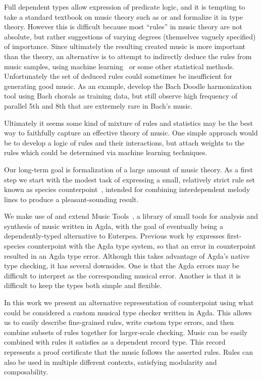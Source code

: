 Full dependent types allow expression of predicate logic, and it is
tempting to take a standard textbook on music theory such as
\citet{piston-harmony} or \citet{aldwell2018harmony} and 
formalize it in type theory. However this is difficult because most
``rules'' in music theory are not absolute, but rather suggestions of
varying degrees (themselves vaguely specified) of importance. Since
ultimately the resulting created music is more important than the
theory, an alternative is to attempt to indirectly deduce the rules
from music samples, using machine learning~\citep{huang-cp} or
some other statistical methods. Unfortunately the set of deduced
rules could sometimes be insufficient for generating good music.
As an example, \citet{roberts-cp} develop the Bach Doodle
harmonization tool using Bach chorals as training data, but still
observe high frequency of parallel 5th and 8th that are extremely
rare in Bach's music.

Ultimately it seems some kind of mixture of rules and statistics may
be the best way to faithfully capture an effective theory of
music. One simple approach would be to develop a logic of rules and
their interactions, but attach weights to the rules which could be
determined via machine learning techniques.

Our long-term goal is formalization of a large amount of music theory.
As a first step we start with the modest task of expressing a small,
relatively strict rule set known as species
counterpoint~\cite{fux-cp}, intended for combining interdependent
melody lines to produce a pleasant-sounding result.

We make use of and extend Music Tools~\citep{MusicTools},
a library of small tools
for analysis and synthesis of music written in Agda, with the goal of
eventually being a dependently-typed alternative to Euterpea.
Previous work by \citet{cong-cp} expresses
first-species counterpoint with the Agda type system, so that an error
in counterpoint resulted in an Agda type error. Although this takes
advantage of Agda's native type checking, it has several
downsides. One is that the Agda errors may be difficult to interpret
as the corresponding musical error. Another is that it is difficult to
keep the types both simple and flexible.

In this work we present an alternative representation of counterpoint
using what could be considered a custom musical type checker written
in Agda. This allows us to easily describe fine-grained rules, write
custom type errors, and then combine subsets of rules together for
larger-scale checking. Music can be easily combined with rules it
satisfies as a dependent record type. This record represents a proof
certificate that the music follows the asserted rules.
Rules can also be used in multiple different contexts, satisfying
modularity and composability.

